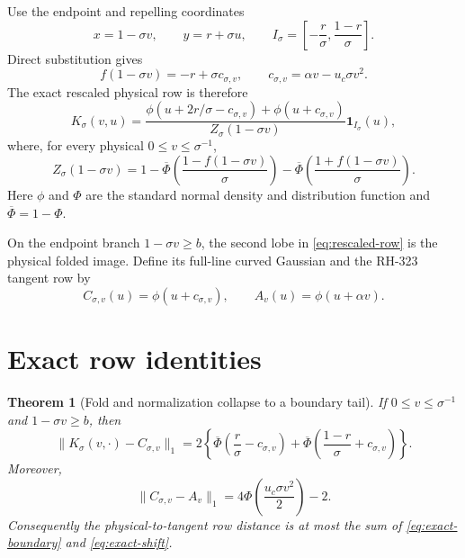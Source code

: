 \documentclass[11pt]{article}
\newtheorem{theorem}{Theorem}[section]
\theoremstyle{remark}
\begin{document}
Use the endpoint and repelling coordinates
\begin{equation}\label{eq:coordinates}
 x=1-\sigma v,
 \qquad y=r+\sigma u,
 \qquad
 I_\sigma=\left[-\frac r\sigma,\frac{1-r}{\sigma}\right].
\end{equation}
Direct substitution gives
\begin{equation}\label{eq:image-expansion}
 f(1-\sigma v)
 =-r+\sigma c_{\sigma,v},
 \qquad
 c_{\sigma,v}=\alpha v-u_c\sigma v^2.
\end{equation}
The exact rescaled physical row is therefore
\begin{equation}\label{eq:rescaled-row}
 K_\sigma(v,u)=
 \frac{
\phi(u+2r/\sigma-c_{\sigma,v})+\phi(u+c_{\sigma,v})
 }{Z_\sigma(1-\sigma v)}\mathbf1_{I_\sigma}(u),
\end{equation}
where, for every physical $0\le v\le\sigma^{-1}$,
\begin{equation}\label{eq:normalizer}
 Z_\sigma(1-\sigma v)
 =1-\overline\Phi\!\left(\frac{1-f(1-\sigma v)}\sigma\right)
   -\overline\Phi\!\left(\frac{1+f(1-\sigma v)}\sigma\right).
\end{equation}
Here $\phi$ and $\Phi$ are the standard normal density and distribution
function and $\overline\Phi=1-\Phi$.

On the endpoint branch $1-\sigma v\ge b$, the second lobe in
\eqref{eq:rescaled-row} is the physical folded image.  Define its full-line
curved Gaussian and the RH-323 tangent row by
\begin{equation}\label{eq:curved-tangent}
 C_{\sigma,v}(u)=\phi(u+c_{\sigma,v}),
 \qquad
 A_v(u)=\phi(u+\alpha v).
\end{equation}

\section{Exact row identities}

\begin{theorem}[Fold and normalization collapse to a boundary tail]
\label{thm:row-identities}
If $0\le v\le\sigma^{-1}$ and $1-\sigma v\ge b$, then
\begin{equation}\label{eq:exact-boundary}
 \boxed{
 \|K_\sigma(v,\cdot)-C_{\sigma,v}\|_1
 =2\left\{
 \overline\Phi\!\left(\frac r\sigma-c_{\sigma,v}\right)
 +\overline\Phi\!\left(\frac{1-r}\sigma+c_{\sigma,v}\right)
 \right\}.}
\end{equation}
Moreover,
\begin{equation}\label{eq:exact-shift}
 \|C_{\sigma,v}-A_v\|_1
 =4\Phi\!\left(\frac{u_c\sigma v^2}{2}\right)-2.
\end{equation}
Consequently the physical-to-tangent row distance is at most the sum of
\eqref{eq:exact-boundary} and \eqref{eq:exact-shift}.
\end{theorem}
\end{document}
